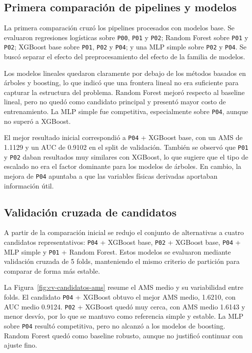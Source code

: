 \documentclass{article}
\begin{document}
\subsection{Primera comparación de pipelines y modelos}
La primera comparación cruzó los pipelines procesados con modelos base. Se evaluaron regresiones logísticas sobre \texttt{P00}, \texttt{P01} y \texttt{P02}; Random Forest sobre \texttt{P01} y \texttt{P02}; XGBoost base sobre \texttt{P01}, \texttt{P02} y \texttt{P04}; y una MLP simple sobre \texttt{P02} y \texttt{P04}. Se buscó separar el efecto del preprocesamiento del efecto de la familia de modelos.

Los modelos lineales quedaron claramente por debajo de los métodos basados en árboles y boosting, lo que indicó que una frontera lineal no era suficiente para capturar la estructura del problema. Random Forest mejoró respecto al baseline lineal, pero no quedó como candidato principal y presentó mayor costo de entrenamiento. La MLP simple fue competitiva, especialmente sobre \texttt{P04}, aunque no superó a XGBoost.

El mejor resultado inicial correspondió a \texttt{P04} + XGBoost base, con un AMS de 1.1129 y un AUC de 0.9102 en el split de validación. También se observó que \texttt{P01} y \texttt{P02} daban resultados muy similares con XGBoost, lo que sugiere que el tipo de escalado no era el factor dominante para los modelos de árboles. En cambio, la mejora de \texttt{P04} apuntaba a que las variables físicas derivadas aportaban información útil.
\subsection{Validación cruzada de candidatos}
A partir de la comparación inicial se redujo el conjunto de alternativas a cuatro candidatos representativos: \texttt{P04} + XGBoost base, \texttt{P02} + XGBoost base, \texttt{P04} + MLP simple y \texttt{P01} + Random Forest. Estos modelos se evaluaron mediante validación cruzada de 5 folds, manteniendo el mismo criterio de partición para comparar de forma más estable.

La Figura~\ref{fig:cv-candidatos-ams} resume el AMS medio y su variabilidad entre folds. El candidato \texttt{P04} + XGBoost obtuvo el mejor AMS medio, 1.6210, con AUC medio 0.9124. \texttt{P02} + XGBoost quedó muy cerca, con AMS medio 1.6143 y menor desvío, por lo que se mantuvo como referencia simple y estable. La MLP sobre \texttt{P04} resultó competitiva, pero no alcanzó a los modelos de boosting. Random Forest quedó como baseline robusto, aunque no justificó continuar con ajuste fino.
\end{document}
